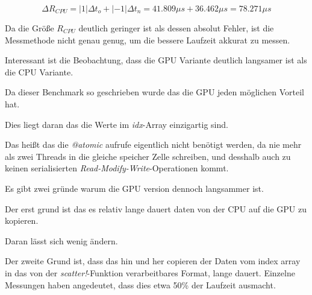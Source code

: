 $$
\Delta R_{CPU} = | 1 | \Delta t_o + |-1| \Delta t_n  = 41.809 \mu s + 36.462 \mu s = 78.271 \mu s
$$


Da die Größe $R_{CPU}$ deutlich geringer ist als dessen absolut Fehler, ist die Messmethode nicht genau genug, um die bessere Laufzeit akkurat zu messen.

Interessant ist die Beobachtung, dass die GPU Variante deutlich langsamer ist als die CPU Variante.

Da dieser Benchmark so geschrieben wurde das die GPU jeden möglichen Vorteil hat.

Dies liegt daran das die Werte im \textit{idx}-Array einzigartig sind.

Das heißt das die \textit{@atomic} aufrufe eigentlich nicht benötigt werden, da nie mehr als zwei Threads in die gleiche speicher Zelle schreiben,
und desshalb auch zu keinen serialisierten \textit{Read-Modify-Write}-Operationen kommt.

Es gibt zwei gründe warum die GPU version dennoch langsammer ist.

Der erst grund ist das es relativ lange dauert daten von der CPU auf die GPU zu kopieren.

Daran lässt sich wenig ändern.

Der zweite Grund ist, dass das hin und her copieren der Daten vom index array in das von der \textit{scatter!}-Funktion verarbeitbares Format, 
lange dauert. Einzelne Messungen haben angedeutet, dass dies etwa 50\% der Laufzeit ausmacht.



